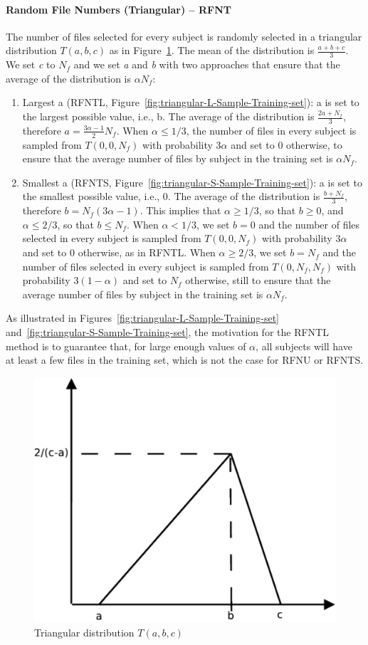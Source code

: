 \documentclass[10pt, conference, compsocconf]{IEEEtran}
\newcommand{\todo}[1]{\marginpar{\parbox{18mm}{\flushleft\tiny\color{red}\textbf{TODO}:
      #1}}}
\begin{document}
\paragraph{Random File Numbers (Triangular) -- RFNT}
The number of files selected for every subject is randomly selected in
a triangular distribution $T(a, b, c)$ as in Figure~\ref{fig:triangular}. The mean of the distribution is 
$\frac{a+b+c}{3}$. We set \textit{c} to $N_{f}$ and we set 
\textit{a} and \textit{b} with two approaches that ensure that the 
average of the distribution is $\alpha N_{f}$: \todo{clarify this part}
\begin{enumerate}
        \item Largest a (RFNTL, Figure~\ref{fig:triangular-L-Sample-Training-set}): a is set to the 
        largest possible value, i.e., b. The average of the 
        distribution is $\frac{2a+N_{f}}{3}$, therefore 
        $a=\frac{3\alpha-1}{2}N_{f}$. When $\alpha \leq 1/3$, the 
        number of files in every subject is sampled from $T(0, 0, N_f)$ 
        with probability $3\alpha$ and set to 0 otherwise, to ensure 
        that the average number of files by subject in the training set 
        is $\alpha N_f$.
        \item Smallest a (RFNTS, Figure~\ref{fig:triangular-S-Sample-Training-set}): a is 
        set to the smallest possible value, i.e., 0. The average of the 
        distribution is $\frac{b+N_{f}}{3}$, therefore 
        $b=N_{f}(3\alpha-1)$. This implies that $\alpha \geq 1/3$, so 
        that $b \geq 0$, and $\alpha \leq 2/3$, so that $b \leq N_f$. 
        When $\alpha < 1/3$, we set $b=0$ and the number of files 
        selected in every subject is sampled from $T(0, 0, N_f)$ with 
        probability $3\alpha$ and set to 0 otherwise, as in RFNTL. 
        When $\alpha \geq 2/3$, we set $b=N_f$ and the number of files 
        selected in every subject is sampled from $T(0, N_f, N_f)$ with 
        probability $3(1-\alpha)$ and set to $N_f$ otherwise, still to 
        ensure that the average number of files by subject in the training set is 
        $\alpha N_f$.
\end{enumerate}
As illustrated in Figures~\ref{fig:triangular-L-Sample-Training-set} 
and~\ref{fig:triangular-S-Sample-Training-set}, the motivation for the 
RFNTL method is to guarantee that, for large enough values of 
$\alpha$, all subjects will have at least a few files in the training 
set, which is not the case for RFNU or RFNTS.
\begin{figure}
\centering
\includegraphics[width=0.5\columnwidth]{figures/triangular.pdf}
\caption{Triangular distribution $T(a, b, c)$}
\label{fig:triangular}
\end{figure}
\end{document}
